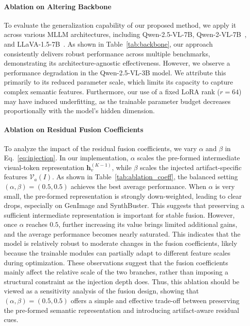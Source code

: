 \documentclass{article}
\theoremstyle{plain}
\theoremstyle{definition}
\theoremstyle{remark}
\begin{document}
\paragraph{Ablation on Altering Backbone}
To evaluate the generalization capability of our proposed method, we apply it across various MLLM architectures, including Qwen-2.5-VL-7B, Qwen-2-VL-7B~\cite{wang2024qwen2}, and LLaVA-1.5-7B~\cite{liu2023visual}. As shown in Table~\ref{tab:backbone}, our approach consistently delivers robust performance across multiple benchmarks, demonstrating its architecture-agnostic effectiveness. However, we observe a performance degradation in the Qwen-2.5-VL-3B model. We attribute this primarily to its reduced parameter scale, which limits its capacity to capture complex semantic features. Furthermore, our use of a fixed LoRA rank ($r=64$) may have induced underfitting, as the trainable parameter budget decreases proportionally with the model's hidden dimension.

\paragraph{Ablation on Residual Fusion Coefficients}

{To analyze the impact of the residual fusion coefficients, we vary $\alpha$ and $\beta$ in Eq.~\ref{eq:injection}. In our implementation, $\alpha$ scales the pre-formed intermediate visual-token representation $\mathbf{h}_v^{(K-1)}$, while $\beta$ scales the injected artifact-specific features $\mathcal{V}_a(I)$. As shown in Table~\ref{tab:ablation_coeff}, the balanced setting $(\alpha,\beta)=(0.5,0.5)$ achieves the best average performance. When $\alpha$ is very small, the pre-formed representation is strongly down-weighted, leading to clear drops, especially on GenImage and SynthBuster. This suggests that preserving a sufficient intermediate representation is important for stable fusion. However, once $\alpha$ reaches $0.5$, further increasing its value brings limited additional gains, and the average performance becomes nearly saturated. This indicates that the model is relatively robust to moderate changes in the fusion coefficients, likely because the trainable modules can partially adapt to different feature scales during optimization. These observations suggest that the fusion coefficients mainly affect the relative scale of the two branches, rather than imposing a structural constraint as the injection depth does. Thus, this ablation should be viewed as a sensitivity analysis of the fusion design, showing that $(\alpha,\beta)=(0.5,0.5)$ offers a simple and effective trade-off between preserving the pre-formed semantic representation and introducing artifact-aware residual cues.}
\end{document}
